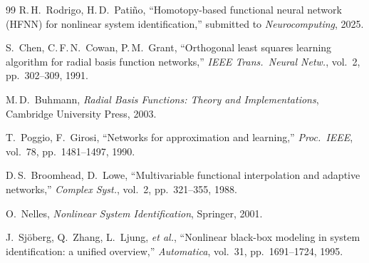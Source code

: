 \documentclass[11pt,a4paper]{article}
\begin{document}
\begin{thebibliography}{99}
R.\,H.\ Rodrigo, H.\,D.\ Pati\~no, ``Homotopy-based functional neural network (HFNN) for nonlinear system identification,'' submitted to \textit{Neurocomputing}, 2025.

S.\ Chen, C.\,F.\,N.\ Cowan, P.\,M.\ Grant, ``Orthogonal least squares learning algorithm for radial basis function networks,'' \textit{IEEE Trans.\ Neural Netw.}, vol.~2, pp.~302--309, 1991.

M.\,D.\ Buhmann, \textit{Radial Basis Functions: Theory and Implementations}, Cambridge University Press, 2003.

T.\ Poggio, F.\ Girosi, ``Networks for approximation and learning,'' \textit{Proc.\ IEEE}, vol.~78, pp.~1481--1497, 1990.

D.\,S.\ Broomhead, D.\ Lowe, ``Multivariable functional interpolation and adaptive networks,'' \textit{Complex Syst.}, vol.~2, pp.~321--355, 1988.

O.\ Nelles, \textit{Nonlinear System Identification}, Springer, 2001.

J.\ Sj\"oberg, Q.\ Zhang, L.\ Ljung, \textit{et al.}, ``Nonlinear black-box modeling in system identification: a unified overview,'' \textit{Automatica}, vol.~31, pp.~1691--1724, 1995.

\end{thebibliography}
\end{document}
